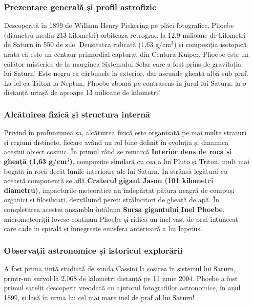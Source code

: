 \subsubsection*{Prezentare generală și profil astrofizic}
Descoperită în 1899 de William Henry Pickering pe plăci fotografice, Phoebe (diametru mediu 213 kilometri) orbitează retrograd la 12,9 milioane de kilometri de Saturn în 550 de zile. Densitatea ridicată (1,63 g/cm$^3$) și compoziția isotopică arată că este un centaur primordial capturat din Centura Kuiper. Phoebe este un călător misterios de la marginea Sistemului Solar care a fost prins de gravitația lui Saturn! Este negru ca cărbunele la exterior, dar ascunde gheață albă sub praf. La fel ca Triton la Neptun, Phoebe zboară \guillemotleft{}pe contrasens\guillemotright{} în jurul lui Saturn, la o distanță uriașă de aproape 13 milioane de kilometri!

\subsubsection*{Alcătuirea fizică și structura internă}
Privind în profunzimea sa, alcătuirea fizică este organizată pe mai multe straturi și regiuni distincte, fiecare având un rol bine definit în evoluția și dinamica acestui obiect cosmic. În primul rând se remarcă \textbf{Interior dens de rocă și gheață (1,63 g/cm$^3$)}, compoziție similară cu cea a lui Pluto și Triton, mult mai bogată în rocă decât lunile interioare ale lui Saturn. În strânsă legătură cu această componentă se află \textbf{Craterul gigant Jason (101 kilometri diametru)}, impacturile meteoritice au îndepărtat pătura neagră de compuși organici și filosilicați, dezvăluind pereți strălucitori de gheață de apă. În completarea acestui ansamblu întâlnim \textbf{Sursa gigantului \guillemotleft{}Inel Phoebe\guillemotright{}}, micrometeoriții lovesc continuu Phoebe și ridică un inel vast de praf întunecat care cade în spirală și înnegrește emisfera anterioară a lui Iapetus.

\subsubsection*{Observații astronomice și istoricul explorării}
A fost prima țintă studiată de sonda Cassini la sosirea în sistemul lui Saturn, printr-un survol la 2.068 de kilometri distanță pe 11 iunie 2004. Phoebe a fost primul satelit descoperit vreodată cu ajutorul fotografiilor astronomice, în anul 1899, și lasă în urma lui cel mai mare inel de praf al lui Saturn!

